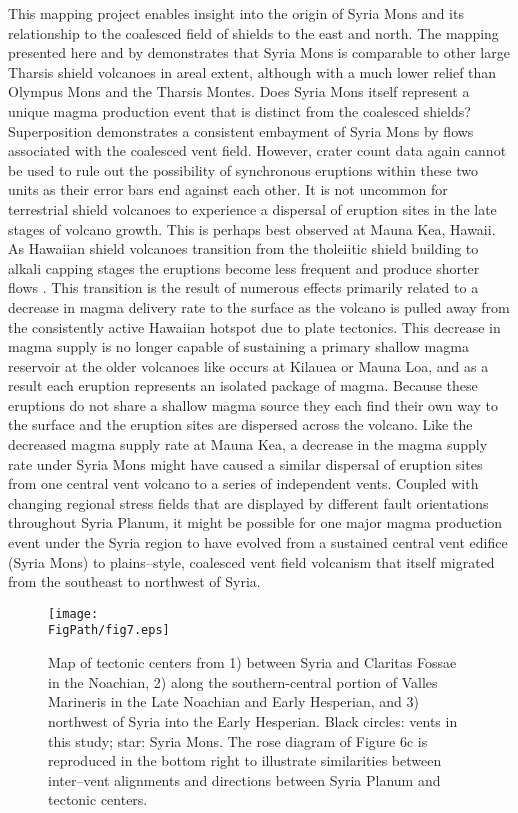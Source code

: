 This mapping project enables insight into the origin of Syria Mons and its relationship to the coalesced field of shields to the east and north.  The mapping presented here and by \citet{baptista2008swarm} demonstrates that Syria Mons is comparable to other large Tharsis shield volcanoes in areal extent, although with a much lower relief than Olympus Mons and the Tharsis Montes.  Does Syria Mons itself represent a unique magma production event that is distinct from the coalesced shields?  Superposition demonstrates a consistent embayment of Syria Mons by flows associated with the coalesced vent field.  However, crater count data again cannot be used to rule out the possibility of synchronous eruptions within these two units as their error bars end against each other. It is not uncommon for terrestrial shield volcanoes to experience a dispersal of eruption sites in the late stages of volcano growth.  This is perhaps best observed at Mauna Kea, Hawaii.  As Hawaiian shield volcanoes transition from the tholeiitic shield building to alkali capping stages the eruptions become less frequent and produce shorter flows \citep{Moore2007,Wolfe1996,Rowland2000,Bleacher2008}.  This transition is the result of numerous effects primarily related to a decrease in magma delivery rate to the surface as the volcano is pulled away from the consistently active Hawaiian hotspot due to plate tectonics.  This decrease in magma supply is no longer capable of sustaining a primary shallow magma reservoir at the older volcanoes like occurs at Kilauea or Mauna Loa, and as a result each eruption represents an isolated package of magma.  Because these eruptions do not share a shallow magma source they each find their own way to the surface and the eruption sites are dispersed across the volcano. Like the decreased magma supply rate at Mauna Kea, a decrease in the magma supply rate under Syria Mons might have caused a similar dispersal of eruption sites from one central vent volcano to a series of independent vents. Coupled with changing regional stress fields that are displayed by different fault orientations throughout Syria Planum, it might be possible for one major magma production event under the Syria region to have evolved from a sustained central vent edifice (Syria Mons) to plains--style, coalesced vent field volcanism that itself migrated from the southeast to northwest of Syria.  

\begin{figure}[ht]
\centering
\texttt{[image: \\FigPath/fig7.eps]}
\caption[Map of tectonic centers from \citet{Anderson2001}]{Map of tectonic centers from \citet{Anderson2001} 1) between Syria and Claritas Fossae in the Noachian, 2) along the southern-central portion of Valles Marineris in the Late Noachian and Early Hesperian, and 3) northwest of Syria into the Early Hesperian. Black circles: vents in this study; star: Syria Mons. The rose diagram of Figure 6c is reproduced in the bottom right to illustrate similarities between inter--vent alignments and directions between Syria Planum and tectonic centers.}
\label{fig-andersoncenters}
\end{figure}

